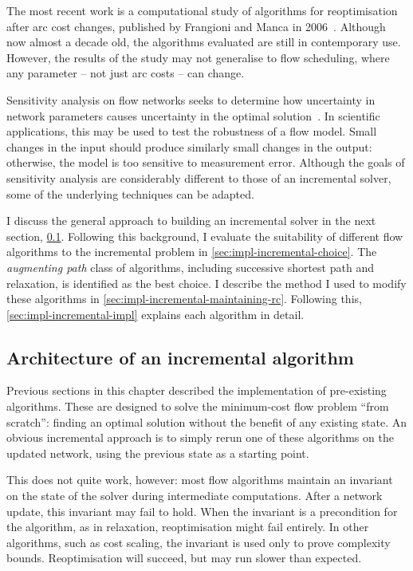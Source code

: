 The most recent work is a computational study of algorithms for reoptimisation after arc cost changes, published by Frangioni and Manca in 2006~\cite{Frangioni:2006}. Although now almost a decade old, the algorithms evaluated are still in contemporary use. However, the results of the study may not generalise to flow scheduling, where any parameter -- not just arc costs -- can change. 

Sensitivity analysis on flow networks seeks to determine how uncertainty in network parameters causes uncertainty in the optimal solution~\cite[\S9.11]{Ahuja:1993}. In scientific applications, this may be used to test the robustness of a flow model. Small changes in the input should produce similarly small changes in the output: otherwise, the model is too sensitive to measurement error. Although the goals of sensitivity analysis are considerably different to those of an incremental solver, some of the underlying techniques can be adapted.

I discuss the general approach to building an incremental solver in the next section, \cref{sec:impl-incremental-architecture}. Following this background, I evaluate the suitability of different flow algorithms to the incremental problem in \cref{sec:impl-incremental-choice}. The \emph{augmenting path} class of algorithms, including successive shortest path and relaxation, is identified as the best choice. I describe the method I used to modify these algorithms in \cref{sec:impl-incremental-maintaining-rc}. Following this, \cref{sec:impl-incremental-impl} explains each algorithm in detail.

\subsection{Architecture of an incremental algorithm} \label{sec:impl-incremental-architecture}

Previous sections in this chapter described the implementation of pre-existing algorithms. These are designed to solve the minimum-cost flow problem ``from scratch'': finding an optimal solution without the benefit of any existing state. An obvious incremental approach is to simply rerun one of these algorithms on the updated network, using the previous state as a starting point.

This does not quite work, however: most flow algorithms maintain an invariant on the state of the solver during intermediate computations. After a network update, this invariant may fail to hold. When the invariant is a precondition for the algorithm, as in relaxation, reoptimisation might fail entirely. In other algorithms, such as cost scaling, the invariant is used only to prove complexity bounds. Reoptimisation will succeed, but may run slower than expected.

